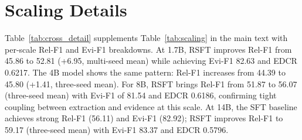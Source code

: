 \begin{table}[t]
\centering
\caption{Full RSFT ablation on DocRED dev set (Qwen3-4B). CED and flat-NLI denote the scoring function used for candidate selection. Best Ign-F1 among evidence-generating methods in \textbf{bold}.}
\label{tab:ablation_full}
\small
{}
\end{table}


\section{Scaling Details}
\label{sec:scaling_details}

Table~\ref{tab:cross_detail} supplements Table~\ref{tab:scaling} in the main text with per-scale Rel-F1 and Evi-F1 breakdowns. At 1.7B, RSFT improves Rel-F1 from 45.86 to 52.81 (+6.95, multi-seed mean) while achieving Evi-F1 82.63 and EDCR 0.6217. The 4B model shows the same pattern: Rel-F1 increases from 44.39 to 45.80 (+1.41, three-seed mean). For 8B, RSFT brings Rel-F1 from 51.87 to 56.07 (three-seed mean) with Evi-F1 of 81.54 and EDCR 0.6186, confirming tight coupling between extraction and evidence at this scale. At 14B, the SFT baseline achieves strong Rel-F1 (56.11) and Evi-F1 (82.92); RSFT improves Rel-F1 to 59.17 (three-seed mean) with Evi-F1 83.37 and EDCR 0.5796.

